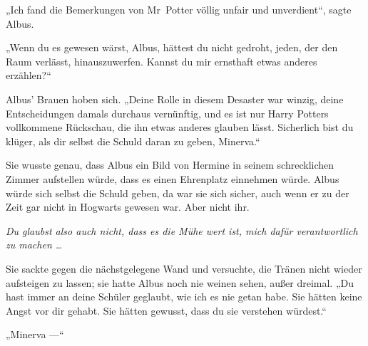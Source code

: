 „Ich fand die Bemerkungen von Mr~Potter völlig unfair und unverdient“, sagte Albus.

„Wenn du es gewesen wärst, Albus, hättest du nicht gedroht, jeden, der den Raum verlässt, hinauszuwerfen. Kannst du mir ernsthaft etwas anderes erzählen?“

Albus’ Brauen hoben sich.
„Deine Rolle in diesem Desaster war winzig, deine Entscheidungen damals durchaus vernünftig, und es ist nur Harry Potters vollkommene Rückschau, die ihn etwas anderes glauben lässt. Sicherlich bist du klüger, als dir selbst die Schuld daran zu geben, Minerva.“

Sie wusste genau, dass Albus ein Bild von Hermine in seinem schrecklichen Zimmer aufstellen würde, dass es einen Ehrenplatz einnehmen würde. Albus würde sich selbst die Schuld geben, da war sie sich sicher, auch wenn er zu der Zeit gar nicht in Hogwarts gewesen war. Aber nicht ihr.

\emph{Du glaubst also auch nicht, dass es die Mühe wert ist, mich dafür verantwortlich zu machen …}

Sie sackte gegen die nächstgelegene Wand und versuchte, die Tränen nicht wieder aufsteigen zu lassen; sie hatte Albus noch nie weinen sehen, außer dreimal.
„Du hast immer an deine Schüler geglaubt, wie ich es nie getan habe. Sie hätten keine Angst vor dir gehabt. Sie hätten gewusst, dass du sie verstehen würdest.“

„Minerva —“


